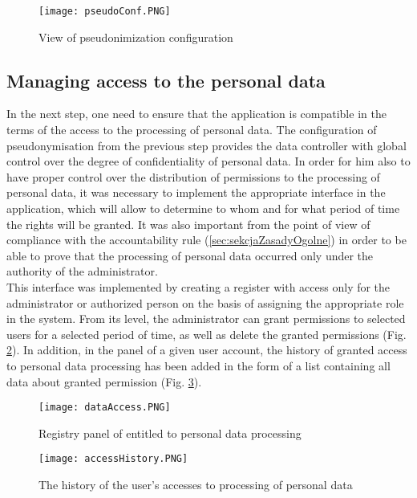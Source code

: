 \documentclass[en, noamssymb]{mgr}
\begin{document}
\begin{figure}[H]
	\centering
	\texttt{[image: pseudoConf.PNG]}
	\caption[View of pseudonimization configuration]{View of pseudonimization configuration}
	\label{fig:pseudonimizationConf}
\end{figure}

\subsection{Managing access to the personal data}

In the next step, one need to ensure that the application is compatible in the terms of the access to the processing of personal data. The configuration of pseudonymisation from the previous step provides the data controller with global control over the degree of confidentiality of personal data. In order for him also to have proper control over the distribution of permissions to the processing of personal data, it was necessary to implement the appropriate interface in the application, which will allow to determine to whom and for what period of time the rights will be granted. It was also important from the point of view of compliance with the accountability rule (\ref{sec:sekcjaZasadyOgolne}) in order to be able to prove that the processing of personal data occurred only under the authority of the administrator.\\
\indent This interface was implemented by creating a register with access only for the administrator or authorized person on the basis of assigning the appropriate role in the system. From its level, the administrator can grant permissions to selected users for a selected period of time, as well as delete the granted permissions (Fig. \ref{fig:dataAccessPanel}). In addition, in the panel of a given user account, the history of granted access to personal data processing has been added in the form of a list containing all data about granted permission (Fig. \ref{fig:usersDataAccessHistory}).

\begin{figure}[H]
	\centering
	\texttt{[image: dataAccess.PNG]}
	\caption[Registry panel of entitled to personal data processing]{Registry panel of entitled to personal data processing}
	\label{fig:dataAccessPanel}
\end{figure}

\begin{figure}[H]
	\centering
	\texttt{[image: accessHistory.PNG]}
	\caption[The history of the user's accesses to processing of personal data]{The history of the user's accesses to processing of personal data}
	\label{fig:usersDataAccessHistory}
\end{figure}
\end{document}
